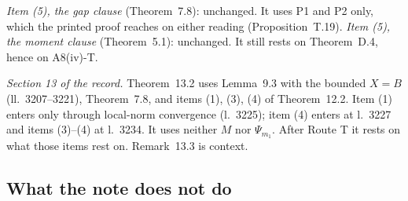 \documentclass[11pt,a4paper]{article}
\theoremstyle{plain}
\theoremstyle{definition}
\begin{document}
\emph{Item (5), the gap clause} (Theorem~7.8): unchanged.  It uses P1 and P2 only, which the
printed proof reaches on either reading (Proposition~T.19).  \emph{Item (5), the moment clause}
(Theorem~5.1): unchanged.  It still rests on Theorem~D.4, hence on A8(iv)-T.

\emph{Section 13 of the record.}  Theorem~13.2 uses Lemma~9.3 with the bounded $X=B$
(ll.~3207--3221), Theorem~7.8, and items (1), (3), (4) of Theorem~12.2.  Item (1) enters only
through local-norm convergence (l.~3225); item (4) enters at l.~3227 and items (3)--(4) at
l.~3234.  It uses
neither $M$ nor $\Psi_{m_1}$.  After Route T it rests on what those items rest on.
Remark~13.3 is context.

\subsection{What the note does not do}
\end{document}
